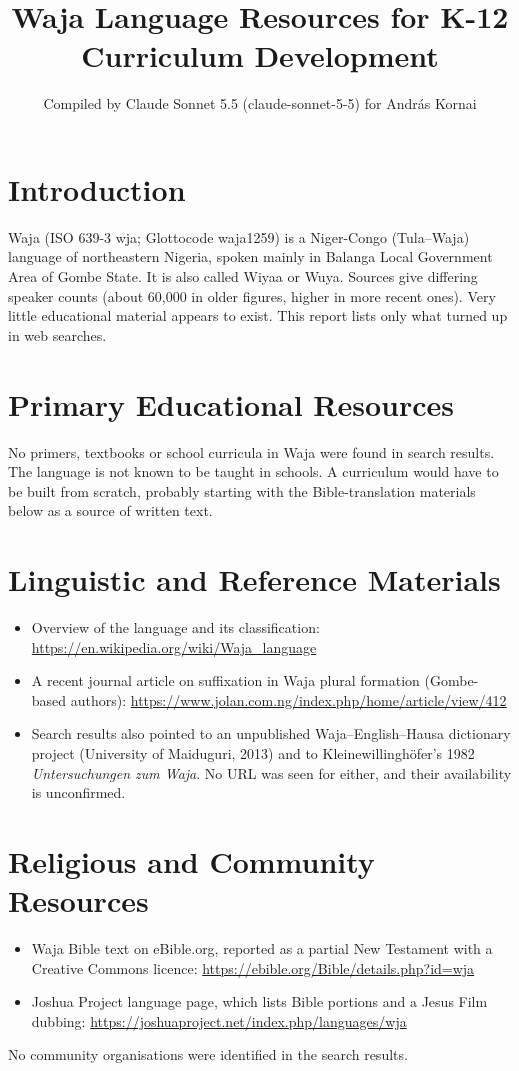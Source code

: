 \documentclass[12pt]{article}
\title{Waja Language Resources for K-12 Curriculum Development}
\author{Compiled by Claude Sonnet 5.5 (claude-sonnet-5-5) for Andr\'as Kornai}
\date{}
\begin{document}
\maketitle

\section{Introduction}
Waja (ISO 639-3 wja; Glottocode waja1259) is a Niger-Congo (Tula--Waja) language of northeastern Nigeria, spoken mainly in Balanga Local Government Area of Gombe State. It is also called Wiyaa or Wuya. Sources give differing speaker counts (about 60,000 in older figures, higher in more recent ones). Very little educational material appears to exist. This report lists only what turned up in web searches.

\section{Primary Educational Resources}
No primers, textbooks or school curricula in Waja were found in search results. The language is not known to be taught in schools. A curriculum would have to be built from scratch, probably starting with the Bible-translation materials below as a source of written text.

\section{Linguistic and Reference Materials}
\begin{itemize}
\item Overview of the language and its classification: \url{https://en.wikipedia.org/wiki/Waja_language}
\item A recent journal article on suffixation in Waja plural formation (Gombe-based authors): \url{https://www.jolan.com.ng/index.php/home/article/view/412}
\item Search results also pointed to an unpublished Waja--English--Hausa dictionary project (University of Maiduguri, 2013) and to Kleinewillinghöfer's 1982 \emph{Untersuchungen zum Waja}. No URL was seen for either, and their availability is unconfirmed.
\end{itemize}

\section{Religious and Community Resources}
\begin{itemize}
\item Waja Bible text on eBible.org, reported as a partial New Testament with a Creative Commons licence: \url{https://ebible.org/Bible/details.php?id=wja}
\item Joshua Project language page, which lists Bible portions and a Jesus Film dubbing: \url{https://joshuaproject.net/index.php/languages/wja}
\end{itemize}
No community organisations were identified in the search results.
\end{document}
